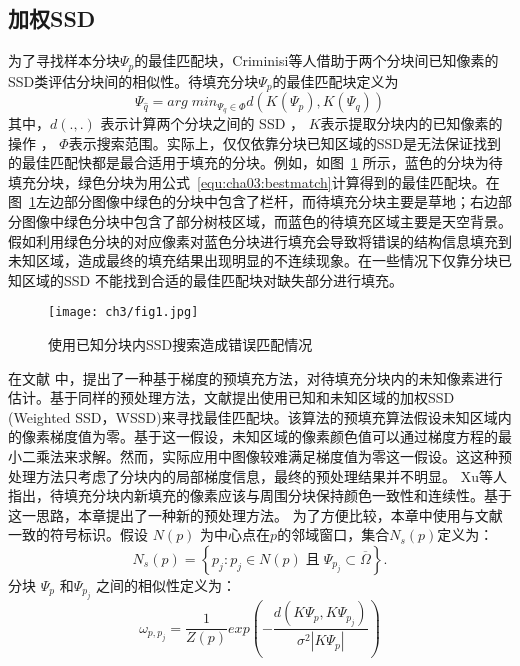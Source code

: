  \subsection{加权SSD}
 \label{sec:sub:WSSD}
 为了寻找样本分块\(\Psi_p\)的最佳匹配块，Criminisi等人\cite{Criminisi04regionfilling}借助于两个分块间已知像素的SSD类评估分块间的相似性。待填充分块\(\Psi_p\)的最佳匹配块定义为
 \begin{equation}
 \label{equ:cha03:bestmatch}
 \Psi_{\hat{q}}=arg\;min_{\Psi_q\in\Phi}d(K(\Psi_p),K(\Psi_q))
 \end{equation}
 其中，\(d(.,.)\) 表示计算两个分块之间的 SSD ， \(K\)表示提取分块内的已知像素的操作 ， \(\Phi\)表示搜索范围。实际上，仅仅依靠分块已知区域的SSD是无法保证找到的最佳匹配快都是最合适用于填充的分块。例如，如图~\ref{cha03:fig:1} 所示，蓝色的分块为待填充分块，绿色分块为用公式~\ref{equ:cha03:bestmatch}计算得到的最佳匹配块。在图~\ref{cha03:fig:1}左边部分图像中绿色的分块中包含了栏杆，而待填充分块主要是草地；右边部分图像中绿色分块中包含了部分树枝区域，而蓝色的待填充区域主要是天空背景。假如利用绿色分块的对应像素对蓝色分块进行填充会导致将错误的结构信息填充到未知区域，造成最终的填充结果出现明显的不连续现象。在一些情况下仅靠分块已知区域的SSD 不能找到合适的最佳匹配块对缺失部分进行填充。
 \begin{figure}[!htbp]
 	\begin{center}
 			\texttt{[image: ch3/fig1.jpg]}
 	\end{center}
     \caption{使用已知分块内SSD搜索造成错误匹配情况}
 	\label{cha03:fig:1}
 \end{figure}
 在文献 中，提出了一种基于梯度的预填充方法，对待填充分块内的未知像素进行估计。基于同样的预处理方法，文献提出使用已知和未知区域的加权SSD (Weighted SSD，WSSD)来寻找最佳匹配块。该算法的预填充算法假设未知区域内的像素梯度值为零。基于这一假设，未知区域的像素颜色值可以通过梯度方程的最小二乘法来求解。然而，实际应用中图像较难满足梯度值为零这一假设。这这种预处理方法只考虑了分块内的局部梯度信息，最终的预处理结果并不明显。 Xu等人\cite{Xu:2010}指出，待填充分块内新填充的像素应该与周围分块保持颜色一致性和连续性。基于这一思路，本章提出了一种新的预处理方法。
 为了方便比较，本章中使用与文献一致的符号标识。假设 \(N(p)\) 为中心点在\(p\)的邻域窗口，集合\(N_s(p)\)定义为：
 $$N_s(p)= \left\{ p_j:p_j \in N(p)\;且\;\Psi_{p_j} \subset \overline{\Omega} \right\}.$$
 分块 \(\Psi_p\) 和\(\Psi_{p_j}\)  之间的相似性定义为：
 $$\omega_{p,p_{j}}=\frac{1}{Z(p)}exp\left(-\frac{d(K\Psi_p,K\Psi_{p_j})}{\sigma^2\left|K\Psi_p\right|}\right)$$
